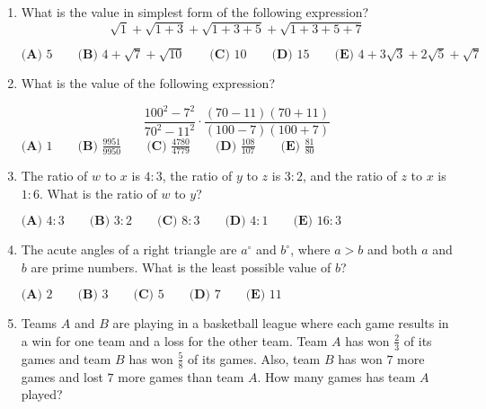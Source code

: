 \documentclass{article}
\begin{document}
\begin{enumerate}[label=\arabic*., itemsep=0.5em]
\item What is the value in simplest form of the following expression?
\begin{equation*}
\sqrt{1} + \sqrt{1+3} + \sqrt{1+3+5} + \sqrt{1+3+5+7}
\end{equation*}


\(\textbf{(A) }5 \qquad \textbf{(B) }4 + \sqrt{7} + \sqrt{10} \qquad \textbf{(C) } 10 \qquad \textbf{(D) } 15 \qquad \textbf{(E) } 4 + 3\sqrt{3} + 2\sqrt{5} + \sqrt{7}\)\par \vspace{0.5em}\item What is the value of the following expression?

\begin{equation*}
\frac{100^2-7^2}{70^2-11^2} \cdot \frac{(70-11)(70+11)}{(100-7)(100+7)}
\end{equation*}
\(\textbf{(A) } 1 \qquad \textbf{(B) } \frac{9951}{9950} \qquad \textbf{(C) } \frac{4780}{4779} \qquad \textbf{(D) } \frac{108}{107} \qquad \textbf{(E) } \frac{81}{80} \)\par \vspace{0.5em}\item The ratio of \(w\) to \(x\) is \(4 : 3\), the ratio of \(y\) to \(z\) is \(3 : 2\), and the ratio of \(z\) to \(x\) is \(1 : 6\). What is the ratio of \(w\) to \(y\)?

\(\textbf{(A) }4:3 \qquad \textbf{(B) }3:2 \qquad \textbf{(C) } 8:3 \qquad \textbf{(D) } 4:1 \qquad \textbf{(E) } 16:3 \)\par \vspace{0.5em}\item The acute angles of a right triangle are \(a^{\circ}\) and \(b^{\circ}\), where \(a>b\) and both \(a\) and \(b\) are prime numbers. What is the least possible value of \(b\)?

\(\textbf{(A) }2\qquad\textbf{(B) }3\qquad\textbf{(C) }5\qquad\textbf{(D) }7\qquad\textbf{(E) }11\)\par \vspace{0.5em}\item Teams \(A\) and \(B\) are playing in a basketball league where each game results in a win for one team and a loss for the other team. Team \(A\) has won \(\tfrac{2}{3}\) of its games and team \(B\) has won \(\tfrac{5}{8}\) of its games. Also, team \(B\) has won \(7\) more games and lost \(7\) more games than team \(A.\) How many games has team \(A\) played?


\end{enumerate}
\end{document}

